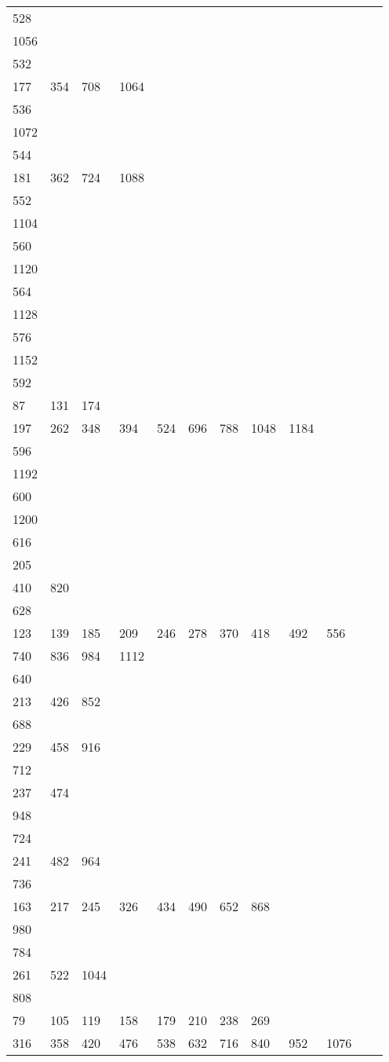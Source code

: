 \begin{longtable}{llllllllllll}
528&&&&&&&&&&&\\
1056& \\
532&&&&&&&&&&&\\
177& 354& 708& 1064\\
536&&&&&&&&&&&\\
1072& \\
544&&&&&&&&&&&\\
181& 362& 724& 1088& \\
552&&&&&&&&&&&\\
1104& \\
560&&&&&&&&&&&\\
1120& \\
564&&&&&&&&&&&\\
1128& \\
576&&&&&&&&&&&\\
1152& \\
592&&&&&&&&&&&\\
87& 131& 174\\
197& 262& 348& 394& 524& 696& 788& 1048& 1184& \\
596&&&&&&&&&&&\\
1192& \\
600&&&&&&&&&&&\\
1200& \\
616&&&&&&&&&&&\\
205\\
410& 820& \\
628&&&&&&&&&&&\\
123& 139& 185& 209& 246& 278& 370& 418& 492& 556\\
740& 836& 984& 1112& \\
640&&&&&&&&&&&\\
213& 426& 852& \\
688&&&&&&&&&&&\\
229& 458& 916& \\
712&&&&&&&&&&&\\
237& 474\\
948& \\
724&&&&&&&&&&&\\
241& 482& 964& \\
736&&&&&&&&&&&\\
163& 217& 245& 326& 434& 490& 652& 868\\
980& \\
784&&&&&&&&&&&\\
261& 522& 1044& \\
808&&&&&&&&&&&\\
79& 105& 119& 158& 179& 210& 238& 269\\
316& 358& 420& 476& 538& 632& 716& 840& 952& 1076& \\

\end{longtable}
